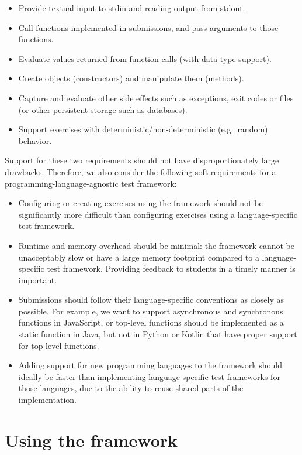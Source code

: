 \documentclass[../main]{subfiles}
\begin{document}
\begin{itemize}[noitemsep]
    \item Provide textual input to stdin and reading output from stdout.
    \item Call functions implemented in submissions, and pass arguments to those functions.
    \item Evaluate values returned from function calls (with data type support).
    \item Create objects (constructors) and manipulate them (methods).
    \item Capture and evaluate other side effects such as exceptions, exit codes or files (or other persistent storage such as databases).
    \item Support exercises with deterministic/non-deterministic (e.g.\ random) behavior.
\end{itemize}

Support for these two requirements should not have disproportionately large drawbacks.
Therefore, we also consider the following soft requirements for a programming-language-agnostic test framework:

\begin{itemize}
    \item Configuring or creating exercises using the framework should not be significantly more difficult than configuring exercises using a language-specific test framework.
    \item Runtime and memory overhead should be minimal: the framework cannot be unacceptably slow or have a large memory footprint compared to a language-specific test framework.
    Providing feedback to students in a timely manner is important.
    \item Submissions should follow their language-specific conventions as closely as possible.
    For example, we want to support asynchronous and synchronous functions in JavaScript, or top-level functions should be implemented as a static function in Java, but not in Python or Kotlin that have proper support for top-level functions.
    \item Adding support for new programming languages to the framework should ideally be faster than implementing language-specific test frameworks for those languages, due to the ability to reuse shared parts of the implementation.
\end{itemize}

\section{Using the framework}\label{sec:tested1-using-the-framework}
\end{document}
